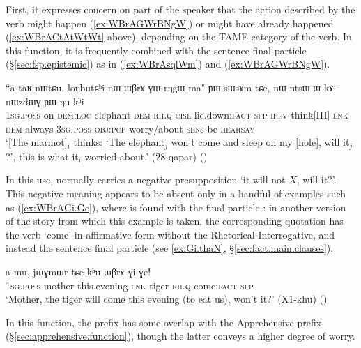 First, it expresses concern on part of the speaker that the action described by the verb might happen (\ref{ex:WBrAGWrBNgW}) or might have already happened (\ref{ex:WBrACtAtWtWt} above), depending on the TAME category of the verb. In this function, it is frequently combined with the sentence final particle  (§\ref{sec:fsp.epistemic}) as in (\ref{ex:WBrAsqlWm}) and (\ref{ex:WBrAGWrBNgW}).
 
 \begin{exe}
\ex \label{ex:WBrAGWrBNgW}
\gll  ``a-taʁ nɯtɕu,  loŋbutɕʰi nɯ ɯβrɤ-ɣɯ-rŋgɯ ma" ɲɯ-sɯsɤm tɕe, nɯ ntsɯ ɯ-kɤ-nɯzdɯɣ ɲɯ-ŋu kʰi \\ 
\textsc{1sg}.\textsc{poss}-on \textsc{dem}:\textsc{loc} elephant \textsc{dem} \textsc{rh}.\textsc{q}-\textsc{cisl}-lie.down:\textsc{fact} \textsc{sfp} \textsc{ipfv}-think[III] \textsc{lnk} \textsc{dem} always \textsc{3sg}.\textsc{poss}-\textsc{obj}:\textsc{pcp}-worry/about \textsc{sens}-be \textsc{hearsay} \\
\glt `[The marmot]$_i$ thinks: `The elephant$_j$ won't come and sleep on my [hole], will it$_j$?', this is what it$_i$ worried about.' (28-qapar)
()
\end{exe}

In this use,  normally carries a negative presupposition `it will not $X$, will it?'. This negative meaning appears to be absent only  in a handful of examples such as (\ref{ex:WBrAGi.Ge}), where  is found with the final particle : in another version of the story from which this example is taken, the corresponding quotation has the verb  `come' in affirmative form without the Rhetorical Interrogative, and instead the sentence final particle  (see \ref{ex:Gi.thaN}, §\ref{sec:fact.main.clauses}).

\begin{exe}
\ex \label{ex:WBrAGi.Ge}
\gll  a-mu, jɯɣmɯr tɕe kʰu ɯβrɤ-ɣi ɣe! \\
\textsc{1sg}.\textsc{poss}-mother this.evening \textsc{lnk} tiger \textsc{rh}.\textsc{q}-come:\textsc{fact} \textsc{sfp} \\
\glt `Mother, the tiger will come this evening (to eat us), won't it?' (X1-khu)
()
\end{exe}
 
In this function, the prefix  has some overlap with the Apprehensive prefix  (§\ref{sec:apprehensive.function}), though the latter conveys a higher degree of worry.

